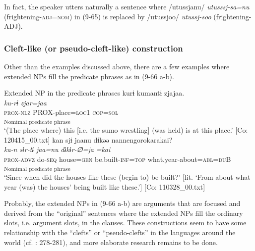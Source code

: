 In fact, the speaker utters naturally a sentence where /utussjanu/ \textit{utusssj-sa=nu} (frightening-\textsc{adj}=\textsc{nom}) in (9-65) is replaced by /utussjoo/ \textit{utussj-soo} (frightening-ADJ).

\subsubsection{Cleft-like (or pseudo-cleft-like) construction}\label{sec:9.3.3.2}

Other than the examples discussed above, there are a few examples where extended NPs fill the predicate phrases as in (9-66 a-b).

\ea   Extended NP in the predicate phrases \label{ex:9.66}
\ea %
 \gllll  kurɨ  kumantɨ  zjajaa.\\
      \textit{ku-rɨ}  \textit{}  \textit{zjar=jaa}\\
      \textsc{prox}-\textsc{nlz}  PROX-place=\textsc{loc}1  \textsc{cop}=\textsc{sol}\\
        [Extended NP  Copula verb]\textsubscript{Nomimal predicate phrase}\\
      \glt       ‘(The place where) this [i.e. the sumo wrestling] (was held) is at this place.’ [Co: 120415\_00.txt]
\ex %
  \glll kan  sjɨ  jaanu  dɨkəə    {\textbar}nannengoro{\textbar}karakai?\\
      \textit{ka-n}  \textit{sɨr-tɨ}  \textit{jaa=nu}  \textit{dɨkɨr-∅=ja} \textit{=kai}\\                                                                           
      \textsc{prox}-\textsc{advz}  do-\textsc{seq}  house=\textsc{gen}  be.built-\textsc{inf}=\textsc{top}                       what.year-about=\textsc{abl}=\textsc{du}B\\
                                                                           [Extended NP]\textsubscript{Nomimal predicate phrase}\\
      \glt ‘Since when did the houses like these (begin to) be built?’ [lit. ‘From about what year (was) the houses’ being built like these.’]   [Co: 110328\_00.txt]
    \z
\z

Probably, the extended NPs in (9-66 a-b) are arguments that are focused and derived from the “original” sentences where the extended NPs fill the ordinary slots, i.e. argument slots, in the clauses. These constructions seem to have some relationship with the “clefts” or “pseudo-clefts” in the languages around the world (cf. \citealt{Payne1997}: 278-281), and more elaborate research remains to be done.

